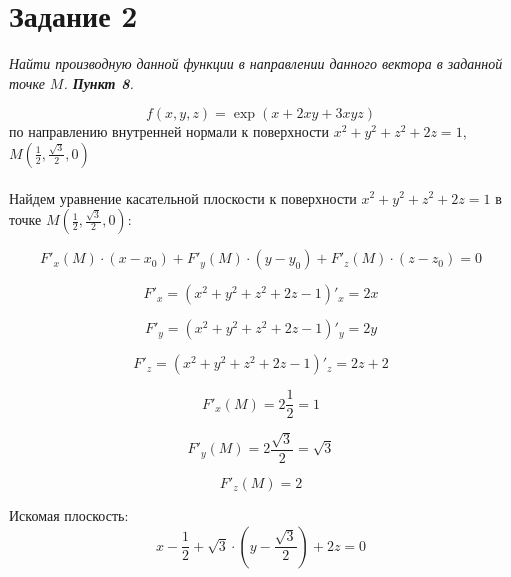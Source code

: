 \documentclass[a5paper, 10pt]{article}
\theoremstyle{definition}
\theoremstyle{plain}
\theoremstyle{remark}
\begin{document}
\section{Задание 2}
\textit{Найти производную данной функции в направлении данного вектора в заданной точке $M$. \textbf{Пункт 8}.}

\begin{equation}
f(x, y, z) = \exp(x + 2xy + 3xyz)
\end{equation}
по направлению внутренней нормали к поверхности $x^2 + y^2 + z^2 + 2z = 1$, $M \left( \frac{1}{2}, \frac{\sqrt{3}}{2}, 0 \right)$\\
\\
Найдем уравнение касательной плоскости к поверхности $x^2 + y^2 + z^2 + 2z = 1$ в точке $M \left( \frac{1}{2}, \frac{\sqrt{3}}{2}, 0 \right)$:

\begin{equation}
F'_x \left( M \right) \cdot (x - x_0) + F'_y \left( M \right) \cdot (y - y_0) + F'_z \left( M \right) \cdot (z - z_0) = 0
\end{equation}

\begin{equation}
F'_x = \left(  x^2 + y^2 + z^2 + 2z - 1 \right)'_x = 2x
\end{equation}

\begin{equation}
F'_y = \left(  x^2 + y^2 + z^2 + 2z - 1 \right)'_y = 2y
\end{equation}

\begin{equation}
F'_z = \left(  x^2 + y^2 + z^2 + 2z - 1 \right)'_z = 2z + 2
\end{equation}

\begin{equation}
F'_x  \left( M \right) = 2 \frac{1}{2} = 1
\end{equation}

\begin{equation}
F'_y  \left( M \right) = 2 \frac{\sqrt{3}}{2} = \sqrt{3}
\end{equation}

\begin{equation}
F'_z  \left( M \right) = 2
\end{equation}

Искомая плоскость:
\begin{equation}
x - \frac{1}{2}  +  \sqrt{3} \cdot (y - \frac{\sqrt{3}}{2}) + 2z= 0
\end{equation}
\end{document}
